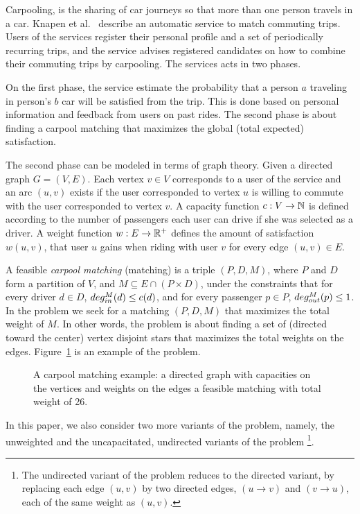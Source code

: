Carpooling, is the sharing of car journeys so that more than one person travels
in a car.
Knapen et al.~\cite{knapen2013estimating} describe an automatic service
to match commuting trips.
Users of the services register their personal profile and a set of periodically
recurring trips, 
and the service advises registered candidates on how to combine their commuting
trips by carpooling.
The services acts in two phases. 

On the first phase, the service estimate the probability that a person $a$
traveling in person's $b$ car will be satisfied from the trip.
This is done based on personal information and feedback from users on past
rides.
The second phase is about finding a carpool matching
that maximizes the global (total expected) satisfaction.

The second phase can be modeled in terms of graph theory.
Given a directed graph $G = (V, E)$.
Each vertex $v \in V$ corresponds to a user of the service and an arc
$(u, v)$ exists if the user corresponded to vertex $u$ is willing to
commute with the user corresponded to vertex $v$.
A capacity function $ c: V \rightarrow \mathbb{N} $ is defined
according to the number of passengers each user can drive if she was
selected as a driver.
A weight function $w : E \rightarrow \mathbb{R^+} $ defines the amount of
satisfaction $w(u, v)$,
that user $u$ gains when riding with user $v$ for every edge $(u, v) \in E$.

A feasible \emph{carpool matching} (matching) is a triple 
$(P, D, M)$, where $P$ and $D$ form a partition of $V$, and 
$M \subseteq E \cap (P \times D)$,
under the constraints that for every driver $d \in D$, 
$deg^M_{in}(d) \leq c(d)$, 
and for every passenger $p \in P$, ${deg^M_{out}(p) \leq 1}$.
In the \textsc{\CARPOOL{}} problem we seek for a matching $(P, D, M)$ that maximizes the
total weight of $M$.
In other words, the \textsc{\CARPOOL{}} problem is about finding a set of 
(directed toward the center) vertex disjoint stars 
that maximizes the total weights on the edges.
Figure~\ref{fig:carpool} is an example of the \textsc{\CARPOOL{}} problem.
\begin{figure}
\centering

\caption{
\label{fig:carpool}
A carpool matching example: 
a directed graph with capacities on the vertices and weights on the edges 
a feasible matching with total weight of 26. 
}
\end{figure}  

In this paper, we also consider two more variants of the problem, namely, 
the unweighted and the uncapacitated, undirected variants of the problem 
\footnote{The undirected variant of the problem reduces to the directed variant,
by replacing each edge $(u,v)$ by two directed edges,
$(u \rightarrow v)$ and $(v \rightarrow u)$,
each of the same weight as $(u,v)$.}.
  

